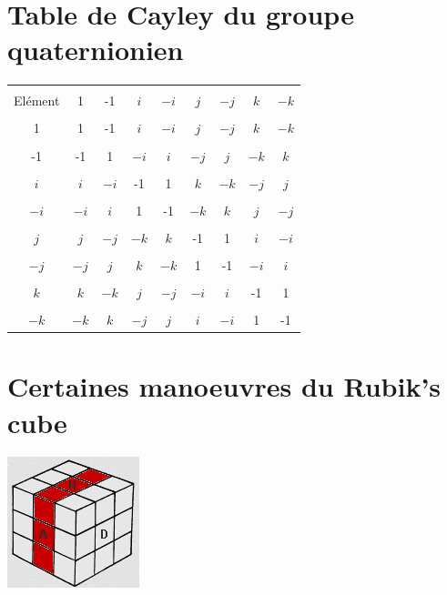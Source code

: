 \documentclass[french]{report}
\begin{document}
\begin{appendix}
  \chapter{Table de Cayley du groupe quaternionien}

  \begin{center}
    \begin{tabular}{|c|c|c|c|c|c|c|c|c|}
      \hline \\
      Elément & 1 & -1 & $i$ & $-i$ & $j$ & $-j$ & $k$ & $-k$ \\
      \hline \\
      1 & 1 & -1 & $i$ & $-i$ & $j$ & $-j$ & $k$ & $-k$ \\
      \hline \\
      -1 & -1 & 1 & $-i$ & $i$ & $-j$ & $j$ & $-k$ & $k$ \\
      \hline \\
      $i$ & $i$ & $-i$ & -1 & 1 & $k$ & $-k$ & $-j$ & $j$ \\
      \hline \\
      $-i$ & $-i$ & $i$ & 1 & -1 & $-k$ & $k$ & $j$ & $-j$ \\
      \hline \\
      $j$ & $j$ & $-j$ & $-k$ & $k$ & -1 & 1 & $i$ & $-i$ \\
      \hline \\
      $-j$ & $-j$ & $j$ & $k$ & $-k$ & 1 & -1 & $-i$ & $i$ \\
      \hline \\
      $k$ & $k$ & $-k$ & $j$ & $-j$ & $-i$ & $i$ & -1 & 1 \\
      \hline \\
      $-k$ & $-k$ & $k$ & $-j$ & $j$ & $i$ & $-i$ & 1 & -1 \\
      \hline
    \end{tabular}

  \end{center}


  \chapter{Certaines manoeuvres du Rubik's cube}

  \begin{center}
    \includegraphics[scale=0.5]{figures/MR.png}
  \end{center}


\end{appendix}
\end{document}

